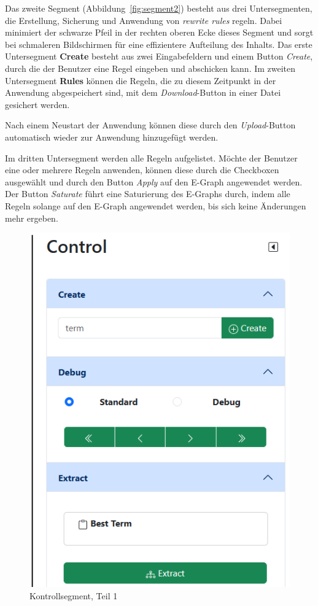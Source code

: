 Das zweite Segment (Abbildung~\ref{fig:segment2}) besteht aus drei Untersegmenten, die Erstellung, Sicherung und Anwendung von \textit{rewrite rules} regeln. 
Dabei minimiert der schwarze Pfeil in der rechten oberen Ecke dieses Segment und sorgt bei schmaleren Bildschirmen für eine effizientere Aufteilung des Inhalts.
Das erste Untersegment \textbf{Create} besteht aus zwei Eingabefeldern und einem Button \textit{Create}, durch die der Benutzer eine Regel eingeben und abschicken kann.
Im zweiten Untersegment \textbf{Rules} können die Regeln, die zu diesem Zeitpunkt in der Anwendung abgespeichert sind, mit dem \textit{Download}-Button in einer Datei gesichert werden.

Nach einem Neustart der Anwendung können diese durch den \textit{Upload}-Button automatisch wieder zur Anwendung hinzugefügt werden. 

Im dritten Untersegment werden alle Regeln aufgelistet. Möchte der Benutzer eine oder mehrere Regeln anwenden, können diese durch die Checkboxen ausgewählt und durch den 
Button \textit{Apply} auf den E-Graph angewendet werden. Der Button \textit{Saturate} führt eine Saturierung des E-Graphs durch, indem alle Regeln solange auf den E-Graph angewendet werden, bis sich keine Änderungen mehr ergeben.

\begin{figure}
    \vspace{-10mm}
    \begin{center}
      \includegraphics[scale=0.6]{../fig/control1.png}
    \end{center}
    \caption{Kontrollsegment, Teil 1}
    \label{fig:segment31}
\end{figure}

